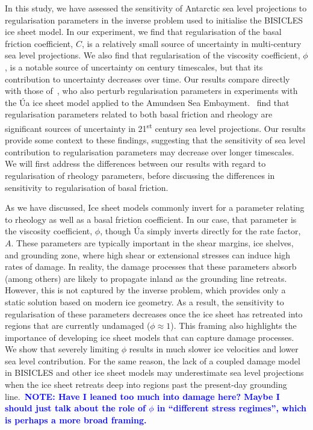\documentclass[journal abbreviation, manuscript]{copernicus}
\newcommand\note[1]{\textbf{\textcolor{blue}{NOTE: #1}}}   %
\begin{document}
In this study, we have assessed the sensitivity of Antarctic sea level projections to regularisation parameters in the inverse problem used to initialise the BISICLES ice sheet model. In our experiment, we find that regularisation of the basal friction coefficient, $C$, is a relatively small source of uncertainty in multi-century sea level projections. We also find that regularisation of the viscosity coefficient, $\phi$, is a notable source of uncertainty on century timescales, but that its contribution to uncertainty decreases over time. Our results compare directly with those of~\cite{rosierCalibratedSeaLevel2025}, who also perturb regularisation parameters in experiments with the Úa ice sheet model applied to the Amundsen Sea Embayment.~\cite{rosierCalibratedSeaLevel2025} find that regularisation parameters related to both basal friction and rheology are significant sources of uncertainty in 21\textsuperscript{st} century sea level projections. Our results provide some context to these findings, suggesting that the sensitivity of sea level contribution to regularisation parameters may decrease over longer timescales. We will first address the differences between our results with regard to regularisation of rheology parameters, before discussing the differences in sensitivity to regularisation of basal friction.

As we have discussed, Ice sheet models commonly invert for a parameter relating to rheology as well as a basal friction coefficient. In our case, that parameter is the viscosity coefficient, $\phi$, though Úa simply inverts directly for the rate factor, $A$. These parameters are typically important in the shear margins, ice shelves, and grounding zone, where high shear or extensional stresses can induce high rates of damage. In reality, the damage processes that these parameters absorb (among others) are likely to propagate inland as the grounding line retreats. However, this is not captured by the inverse problem, which provides only a static solution based on modern ice geometry. As a result, the sensitivity to regularisation of these parameters decreases once the ice sheet has retreated into regions that are currently undamaged ($\phi \approx 1$). This framing also highlights the importance of developing ice sheet models that can capture damage processes. We show that severely limiting $\phi$ results in much slower ice velocities and lower sea level contribution. For the same reason, the lack of a coupled damage model in BISICLES and other ice sheet models may underestimate sea level projections when the ice sheet retreats deep into regions past the present-day grounding line.~\note{Have I leaned too much into damage here? Maybe I should just talk about the role of $\phi$ in ``different stress regimes'', which is perhaps a more broad framing.}
\end{document}
